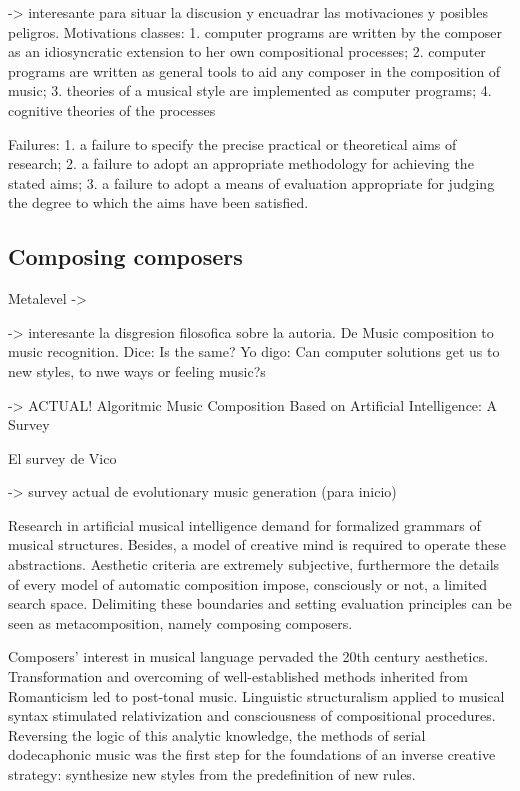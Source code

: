 \documentclass{article}
\begin{document}
{\color{red} 



\cite{Pearce2002} -> interesante para situar la discusion y encuadrar las motivaciones y posibles peligros.
Motivations classes:
1. computer programs are written by the composer as an idiosyncratic extension
to her own compositional processes;
2. computer programs are written as general tools to aid any composer in the
composition of music;
3. theories of a musical style are implemented as computer programs;
4. cognitive theories of the processes

Failures:
1. a failure to specify the precise practical or theoretical aims of research;
2. a failure to adopt an appropriate methodology for achieving the stated aims;
3. a failure to adopt a means of evaluation appropriate for judging the degree to
which the aims have been satisfied.



}

\subsection{Composing composers}


{\color{red}
Metalevel -> \cite{DBLP:journals/aim/Buchanan01}



\cite{JACOB1996} -> interesante la disgresion filosofica sobre la autoria. De Music composition to music recognition. Dice: Is the same? Yo digo: Can computer solutions get us to new styles, to nwe ways or feeling music?s


\cite{LopezRincon2018} -> ACTUAL! Algoritmic Music Composition Based on
Artificial Intelligence: A Survey

El survey de Vico \cite{DBLP:journals/corr/RodriguezV14}


\cite{Dostl2013} -> survey actual de evolutionary music generation (para inicio)
}


Research in artificial musical intelligence demand for formalized
grammars of musical structures. Besides, a model of creative
mind is required to operate these abstractions.
Aesthetic criteria are extremely subjective, furthermore the details
of every model of automatic composition impose, consciously
or not, a limited search space. Delimiting these
boundaries and setting evaluation principles can be seen as
metacomposition, namely composing composers.

Composers' interest in musical language pervaded the 20th
century aesthetics. Transformation and overcoming of well-established methods
inherited from Romanticism led to post-tonal
music. Linguistic structuralism applied to musical
syntax stimulated relativization and consciousness of
compositional procedures. Reversing the logic of this analytic knowledge, the methods
of serial dodecaphonic music was the first step for the foundations of
an inverse creative strategy: synthesize new styles from the predefinition of new rules. 
\end{document}
